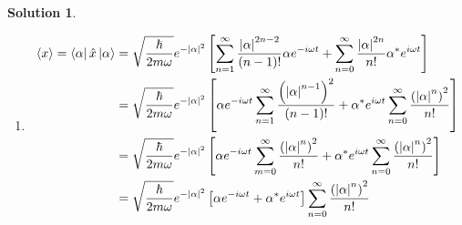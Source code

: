 \documentclass[10pt]{article}
\theoremstyle{definition}
\newtheorem{soln}{Solution}
\begin{document}
\begin{soln}
\begin{enumerate}[label=(\alph*)]
\begin{align*}
          \end{align*}
          And the second term,
          \begin{align*}
             & ~\sum_{k=0}^\infty\frac{(\alpha^*)^k}{\sqrt{k!}}e^{i\omega(k+1/2)t}\bra{k}
            \left(\sum_{n=0}^\infty\frac{\alpha^n}{\sqrt{n!}}e^{-i\omega(n+1/2)t}\sqrt{n+1}\ket{n+1}\right)                   \\
             & =\sum_{k=0}^\infty\sum_{n=0}^\infty\frac{\alpha^n(\alpha^*)^k}{\sqrt{n!k!}}e^{i\omega(k+1/2-n-1/2)t}\sqrt{n+1} \\
             & =\sum_{n=0}^\infty\frac{\alpha^n(\alpha^*)^{n+1}}{\sqrt{n!n!}}e^{i\omega((n+1)+1/2-n-1/2)t}                    \\
             & =\sum_{n=0}^\infty\frac{\abs{\alpha}^{2n}}{n!}\alpha^*e^{i\omega t}.
          \end{align*}
          Recombining these we get the result,
          \begin{align*}
            \expval{x}=\bra{\alpha}\hat{x}\ket{\alpha} & =\sqrt{\frac{\hbar}{2m\omega}}e^{-\abs{\alpha}^2}\left[\sum_{n=1}^\infty\frac{\abs{\alpha}^{2n-2}}{(n-1)!}\alpha e^{-i\omega t}+\sum_{n=0}^\infty\frac{\abs{\alpha}^{2n}}{n!}\alpha^*e^{i\omega t}\right]
          \end{align*}
    \item
          \begin{align*}
            \expval{x}=\bra{\alpha}\hat{x}\ket{\alpha} & =\sqrt{\frac{\hbar}{2m\omega}}e^{-\abs{\alpha}^2}\left[\sum_{n=1}^\infty\frac{\abs{\alpha}^{2n-2}}{(n-1)!}\alpha e^{-i\omega t}+\sum_{n=0}^\infty\frac{\abs{\alpha}^{2n}}{n!}\alpha^*e^{i\omega t}\right]                             \\
                                                       & =\sqrt{\frac{\hbar}{2m\omega}}e^{-\abs{\alpha}^2}\left[\alpha e^{-i\omega t}\sum_{n=1}^\infty\frac{\left(\abs{\alpha}^{n-1}\right)^2}{(n-1)!}+\alpha^*e^{i\omega t}\sum_{n=0}^\infty\frac{\left(\abs{\alpha}^{n}\right)^2}{n!}\right] \\
                                                       & =\sqrt{\frac{\hbar}{2m\omega}}e^{-\abs{\alpha}^2}\left[\alpha e^{-i\omega t}\sum_{m=0}^\infty\frac{\left(\abs{\alpha}^{n}\right)^2}{n!}+\alpha^*e^{i\omega t}\sum_{n=0}^\infty\frac{\left(\abs{\alpha}^{n}\right)^2}{n!}\right]       \\
                                                       & =\sqrt{\frac{\hbar}{2m\omega}}e^{-\abs{\alpha}^2}\left[\alpha e^{-i\omega t}+\alpha^*e^{i\omega t}\right]\sum_{n=0}^\infty\frac{\left(\abs{\alpha}^{n}\right)^2}{n!}                                                                  \\

\end{align*}
\end{enumerate}
\end{soln}
\end{document}
